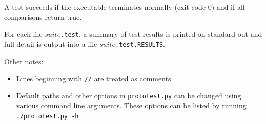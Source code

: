 \documentclass{article}
\newcommand\var[1]{{\tt #1}}
\begin{document}
A test succeeds if the executable terminates normally (exit code 0)
and if all comparisons return true.

For each file \var{$suite$.test}, a summary of test results is printed
on standard out and full detail is output into a file
\var{$suite$.test.RESULTS}.

Other notes:
\begin{itemize}
\item Lines beginning with \var{//} are treated as comments.
\item Default paths and other options in {\tt prototest.py} can be
  changed using various command line arguments.  These options can
  be listed by running {\tt ./prototest.py -h}
\end{itemize}
\end{document}
